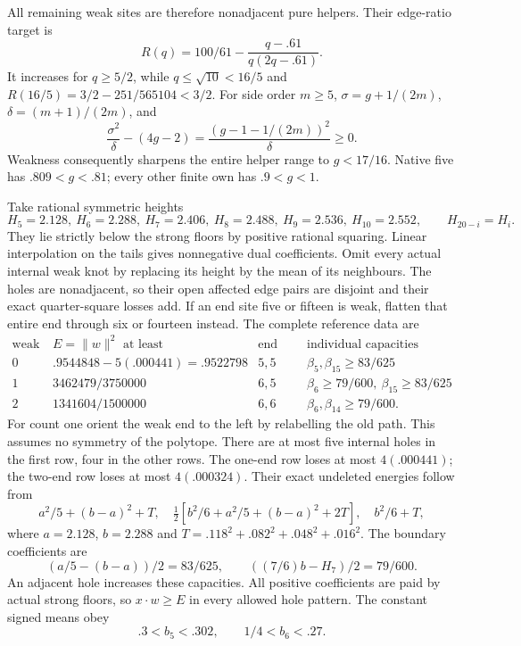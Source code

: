 \documentclass[11pt]{article}
\theoremstyle{definition}
\theoremstyle{remark}
\begin{document}
All remaining weak sites are therefore
nonadjacent pure helpers.
Their edge-ratio target is
\[
 R(q)=100/61-\frac{q-.61}{q(2q-.61)} .
\]
It increases for \(q\ge5/2\), while
\(q\le\sqrt{10}<16/5\) and
\(R(16/5)=3/2-251/565104<3/2\).
For side order \(m\ge5\),
\(\sigma=g+1/(2m)\), \(\delta=(m+1)/(2m)\),
and
\[
 \frac{\sigma^2}{\delta}-(4g-2)
                   =\frac{(g-1-1/(2m))^2}{\delta}\ge0 .
\]
Weakness consequently sharpens the
entire helper range to \(g<17/16\).
Native five has \(.809<g<.81\);
every other finite own has \(.9<g<1\).

Take rational symmetric heights
\[
 H_5=2.128,\ H_6=2.288,\ H_7=2.406,\
 H_8=2.488,\ H_9=2.536,\ H_{10}=2.552,\qquad
 H_{20-i}=H_i .
\]
They lie strictly below the strong
floors by positive rational squaring.
Linear interpolation on the tails
gives nonnegative dual coefficients.
Omit every actual internal weak knot
by replacing its height by the mean
of its neighbours.
The holes are nonadjacent, so their
open affected edge pairs are disjoint
and their exact quarter-square losses
add.
If an end site five or fifteen is
weak, flatten that entire end through
six or fourteen instead.
The complete reference data are
\[
\begin{array}{c|c|c|c}
 \text{weak end count}&E=\|w\|^2\text{ at least}
          &\text{end block lengths}&\text{individual capacities}\\ \hline
 0&.9544848-5(.000441)=.9522798&5,5&
             \beta_5,\beta_{15}\ge83/625\\
 1&3462479/3750000&6,5&
             \beta_6\ge79/600,\ \beta_{15}\ge83/625\\
 2&1341604/1500000&6,6&
             \beta_6,\beta_{14}\ge79/600 .
\end{array}
\tag{A19refs}\label{app:exact19:eq:Arefs}
\]
For count one orient the weak end to
the left by relabelling the old path.
This assumes no symmetry of the polytope.
There are at most five internal holes
in the first row, four in the other
rows.
The one-end row loses at most
\(4(.000441)\); the two-end row loses
at most \(4(.000324)\).
Their exact undeleted energies follow
from
\[
 a^2/5+(b-a)^2+T,\quad
 \tfrac12[b^2/6+a^2/5+(b-a)^2+2T],\quad
 b^2/6+T,
\]
where \(a=2.128\), \(b=2.288\) and
\(T=.118^2+.082^2+.048^2+.016^2\).
The boundary coefficients are
\[
 (a/5-(b-a))/2=83/625,\qquad
                    ((7/6)b-H_7)/2=79/600 .
\]
An adjacent hole increases these
capacities.
All positive coefficients are paid
by actual strong floors, so
\(x\cdot w\ge E\) in every allowed
hole pattern.
The constant signed means obey
\[
                  .3<b_5<.302,\qquad1/4<b_6<.27 .
\]
\end{document}
